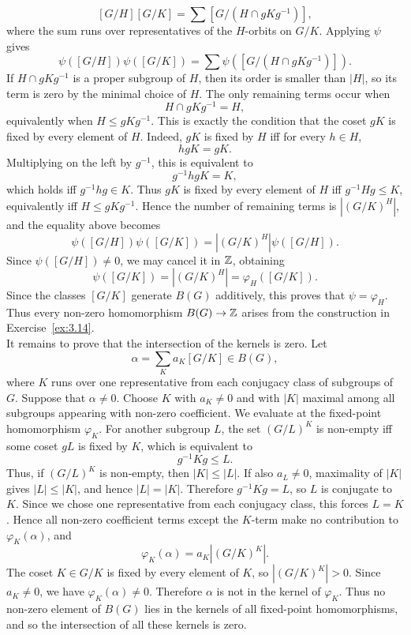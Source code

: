 \documentclass[../Odyssey_Project.tex]{subfiles}
\begin{document}
\begin{solution}
    \[
        [G/H][G/K]
        =
        \sum [G/(H\cap gKg^{-1})],
    \]
    where the sum runs over representatives of the $H$-orbits on $G/K$. Applying $\psi$ gives
    \[
        \psi([G/H])\psi([G/K])
        =
        \sum \psi([G/(H\cap gKg^{-1})]).
    \]
    If $H\cap gKg^{-1}$ is a proper subgroup of $H$, then its order is smaller than $|H|$, so its term is zero by the minimal choice of $H$. The only remaining terms occur when
    \[
        H\cap gKg^{-1}=H,
    \]
    equivalently when $H \leq gKg^{-1}$. This is exactly the condition that the coset $gK$ is fixed by every element of $H$. Indeed, $gK$ is fixed by $H$ iff for every $h\in H$,
    \[
        hgK=gK.
    \]
    Multiplying on the left by $g^{-1}$, this is equivalent to
    \[
        g^{-1}hgK=K,
    \]
    which holds iff $g^{-1}hg\in K$. Thus $gK$ is fixed by every element of $H$ iff $g^{-1}Hg\leq K$, equivalently iff $H\leq gKg^{-1}$.
    Hence the number of remaining terms is $|(G/K)^H|$, and the equality above becomes
    \[
        \psi([G/H])\psi([G/K])
        =
        |(G/K)^H|\psi([G/H]).
    \]
    Since $\psi([G/H])\neq 0$, we may cancel it in $\mathbb{Z}$, obtaining
    \[
        \psi([G/K])=|(G/K)^H|=\varphi_H([G/K]).
    \]
    Since the classes $[G/K]$ generate $B(G)$ additively, this proves that $\psi=\varphi_H$. Thus every non-zero homomorphism $B(G)\to \mathbb{Z}$ arises from the construction in Exercise~\ref{ex:3.14}.\\
    It remains to prove that the intersection of the kernels is zero. Let
    \[
        \alpha=\sum_K a_K[G/K]\in B(G),
    \]
    where $K$ runs over one representative from each conjugacy class of subgroups of $G$. Suppose that $\alpha\neq 0$. Choose $K$ with $a_K\neq 0$ and with $|K|$ maximal among all subgroups appearing with non-zero coefficient.
    We evaluate at the fixed-point homomorphism $\varphi_K$. For another subgroup $L$, the set $(G/L)^K$ is non-empty iff some coset $gL$ is fixed by $K$, which is equivalent to
    \[
        g^{-1}Kg \leq L.
    \]
    Thus, if $(G/L)^K$ is non-empty, then $|K|\leq |L|$. If also $a_L\neq 0$, maximality of $|K|$ gives $|L|\leq |K|$, and hence $|L|=|K|$. Therefore $g^{-1}Kg=L$, so $L$ is conjugate to $K$. Since we chose one representative from each conjugacy class, this forces $L=K$.
    Hence all non-zero coefficient terms except the $K$-term make no contribution to $\varphi_K(\alpha)$, and
    \[
        \varphi_K(\alpha)=a_K |(G/K)^K|.
    \]
    The coset $K\in G/K$ is fixed by every element of $K$, so $|(G/K)^K|>0$. Since $a_K\neq 0$, we have $\varphi_K(\alpha)\neq 0$. Therefore $\alpha$ is not in the kernel of $\varphi_K$.
    Thus no non-zero element of $B(G)$ lies in the kernels of all fixed-point homomorphisms, and so the intersection of all these kernels is zero.
\end{solution}
\end{document}
